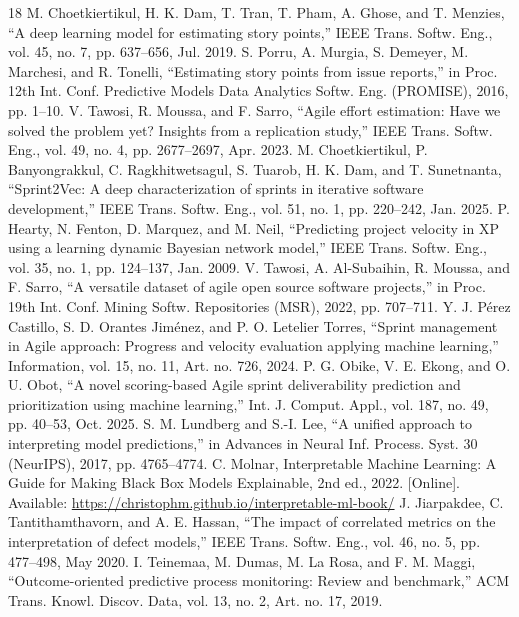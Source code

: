\documentclass[conference]{IEEEtran}
\begin{document}
\begin{thebibliography}{18}
 M. Choetkiertikul, H. K. Dam, T. Tran, T. Pham, A. Ghose, and T. Menzies, ``A deep learning model for estimating story points,'' IEEE Trans. Softw. Eng., vol. 45, no. 7, pp. 637--656, Jul. 2019.
 S. Porru, A. Murgia, S. Demeyer, M. Marchesi, and R. Tonelli, ``Estimating story points from issue reports,'' in Proc. 12th Int. Conf. Predictive Models Data Analytics Softw. Eng. (PROMISE), 2016, pp. 1--10.
 V. Tawosi, R. Moussa, and F. Sarro, ``Agile effort estimation: Have we solved the problem yet? Insights from a replication study,'' IEEE Trans. Softw. Eng., vol. 49, no. 4, pp. 2677--2697, Apr. 2023.
 M. Choetkiertikul, P. Banyongrakkul, C. Ragkhitwetsagul, S. Tuarob, H. K. Dam, and T. Sunetnanta, ``Sprint2Vec: A deep characterization of sprints in iterative software development,'' IEEE Trans. Softw. Eng., vol. 51, no. 1, pp. 220--242, Jan. 2025.
 P. Hearty, N. Fenton, D. Marquez, and M. Neil, ``Predicting project velocity in XP using a learning dynamic Bayesian network model,'' IEEE Trans. Softw. Eng., vol. 35, no. 1, pp. 124--137, Jan. 2009.
 V. Tawosi, A. Al-Subaihin, R. Moussa, and F. Sarro, ``A versatile dataset of agile open source software projects,'' in Proc. 19th Int. Conf. Mining Softw. Repositories (MSR), 2022, pp. 707--711.
 Y. J. Pérez Castillo, S. D. Orantes Jiménez, and P. O. Letelier Torres, ``Sprint management in Agile approach: Progress and velocity evaluation applying machine learning,'' Information, vol. 15, no. 11, Art. no. 726, 2024.
 P. G. Obike, V. E. Ekong, and O. U. Obot, ``A novel scoring-based Agile sprint deliverability prediction and prioritization using machine learning,'' Int. J. Comput. Appl., vol. 187, no. 49, pp. 40--53, Oct. 2025.
 S. M. Lundberg and S.-I. Lee, ``A unified approach to interpreting model predictions,'' in Advances in Neural Inf. Process. Syst. 30 (NeurIPS), 2017, pp. 4765--4774.
 C. Molnar, Interpretable Machine Learning: A Guide for Making Black Box Models Explainable, 2nd ed., 2022. [Online]. Available: \url{https://christophm.github.io/interpretable-ml-book/}
 J. Jiarpakdee, C. Tantithamthavorn, and A. E. Hassan, ``The impact of correlated metrics on the interpretation of defect models,'' IEEE Trans. Softw. Eng., vol. 46, no. 5, pp. 477--498, May 2020.
 I. Teinemaa, M. Dumas, M. La Rosa, and F. M. Maggi, ``Outcome-oriented predictive process monitoring: Review and benchmark,'' ACM Trans. Knowl. Discov. Data, vol. 13, no. 2, Art. no. 17, 2019.

\end{thebibliography}
\end{document}
